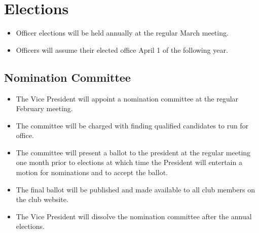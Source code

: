 \documentclass{article}
\begin{document}
\section{Elections}
\begin{itemize}
\item Officer elections will be held annually at the regular March meeting.

\item Officers will assume their elected office April 1 of the following year.
\end{itemize}

\subsection{Nomination Committee}
\begin{itemize}
\item The Vice President will appoint a nomination committee at the regular February meeting.

\item The committee will be charged with finding qualified candidates to run for office.

\item The committee will present a ballot to the president at the regular meeting one month prior to elections at which time the President will entertain a motion for nominations and to accept the ballot.

\item The final ballot will be published and made available to all club members on the club website.

\item The Vice President will dissolve the nomination committee after the annual elections.
\end{itemize}
\end{document}
